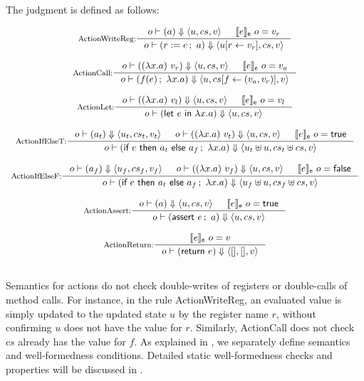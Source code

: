 \begin{definition}
  \label{def-semaction}
  The judgment  is defined as follows:
  \begin{center}
    \begin{math}
      \begin{array}{c}
        \inference[ActionWriteReg:]{\semact{o}{a}{u}{cs}{v} & \semexpr{e}{o} = v_r}
                  {\semact{o}{\actwrite{r}{e}{a}}{\stupd{u}{r}{v_r}}{cs}{v}} \\
        \mbox{} \\
        \inference[ActionCall:]{\semact{o}{(\lambda x.a)\ v_r}{u}{cs}{v} & \semexpr{e}{o} = v_a}
                  {\semact{o}{\actcall{x}{f}{e}{a}}{u}{\lblupd{cs}{f}{(v_a, v_r)}}{v}} \\
        \mbox{} \\
        \inference[ActionLet:]{\semact{o}{(\lambda x.a)\ v_l}{u}{cs}{v} & \semexpr{e}{o} = v_l}
                  {\semact{o}{\actlet{e}{x}{a}}{u}{cs}{v}} \\
        \mbox{} \\
        \inference[ActionIfElseT:]{\semact{o}{a_t}{u_t}{cs_t}{v_t} &
          \semact{o}{(\lambda x.a)\ v_t}{u}{cs}{v} &
          \semexpr{e}{o} = \btrue{}}
                  {\semact{o}{\actifelse{e}{a_t}{a_f}{x}{a}}{\splus{u_t}{u}}{\splus{cs_t}{cs}}{v}} \\
        \mbox{} \\
        \inference[ActionIfElseF:]{\semact{o}{a_f}{u_f}{cs_f}{v_f} &
          \semact{o}{(\lambda x.a)\ v_f}{u}{cs}{v} &
          \semexpr{e}{o} = \bfalse{}}
                  {\semact{o}{\actifelse{e}{a_t}{a_f}{x}{a}}{\splus{u_f}{u}}{\splus{cs_f}{cs}}{v}} \\
        \mbox{} \\
        \inference[ActionAssert:]{\semact{o}{a}{u}{cs}{v} & \semexpr{e}{o} = \btrue{}}
                  {\semact{o}{\actassert{e}{a}}{u}{cs}{v}} \\
        \mbox{} \\
        \inference[ActionReturn:]{\semexpr{e}{o} = v}
                  {\semact{o}{\actret{e}}{\emptymap{}}{\emptymap{}}{v}} \\
        \mbox{} \\
      \end{array}
    \end{math}
  \end{center}
\end{definition}

Semantics for actions do not check double-writes of registers or
double-calls of method calls. For instance, in the rule
ActionWriteReg, an evaluated value is simply updated to the updated
state $u$ by the register name $r$, without confirming $u$ does not
have the value for $r$. Similarly, ActionCall does not check $cs$
already has the value for $f$. As explained in
, we separately define semantics and
well-formedness conditions. Detailed static well-formedness checks and
properties will be discussed in .

